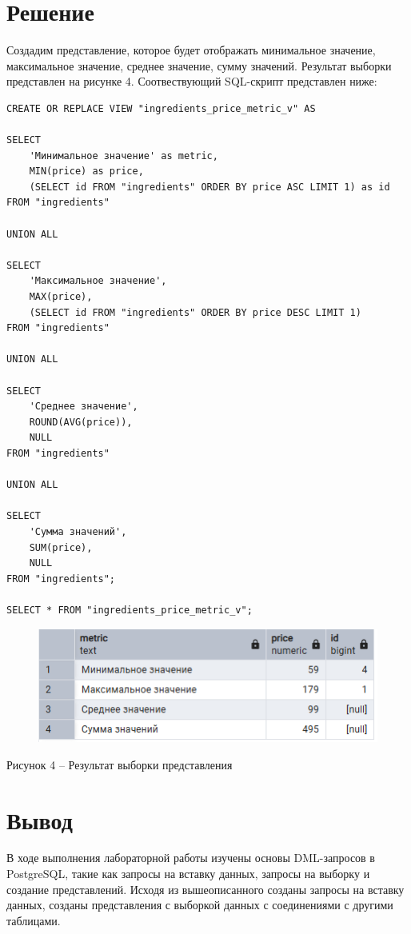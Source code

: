 \documentclass[a4paper,14pt]{extarticle}
\begin{document}
  \pagebreak
  \section*{Решение}
  Создадим представление, которое будет отображать минимальное значение, максимальное значение, среднее значение, сумму значений. Результат выборки представлен на рисунке 4. Соотвествующий SQL-скрипт представлен ниже:

  \noindent
  \begin{Verbatim}[tabsize=4,fontsize=\small]
CREATE OR REPLACE VIEW "ingredients_price_metric_v" AS

SELECT
    'Минимальное значение' as metric,
    MIN(price) as price,
    (SELECT id FROM "ingredients" ORDER BY price ASC LIMIT 1) as id
FROM "ingredients"

UNION ALL

SELECT
    'Максимальное значение',
    MAX(price),
    (SELECT id FROM "ingredients" ORDER BY price DESC LIMIT 1)
FROM "ingredients"

UNION ALL

SELECT
    'Среднее значение',
    ROUND(AVG(price)),
    NULL
FROM "ingredients"

UNION ALL

SELECT
    'Сумма значений',
    SUM(price),
    NULL
FROM "ingredients";

SELECT * FROM "ingredients_price_metric_v";
  \end{Verbatim}

  \begin{figure}[h]
    \centering
    \includegraphics[width=0.75\linewidth]{img/view-1}
  \end{figure}
  \begin{center}
    Рисунок 4 – Результат выборки представления
  \end{center}

  \section*{Вывод}
  В ходе выполнения лабораторной работы изучены основы DML-запросов в PostgreSQL, такие как запросы на вставку данных, запросы на выборку и создание представлений. Исходя из вышеописанного созданы запросы на вставку данных, созданы представления с выборкой данных с соединениями с другими таблицами.
\end{document}

